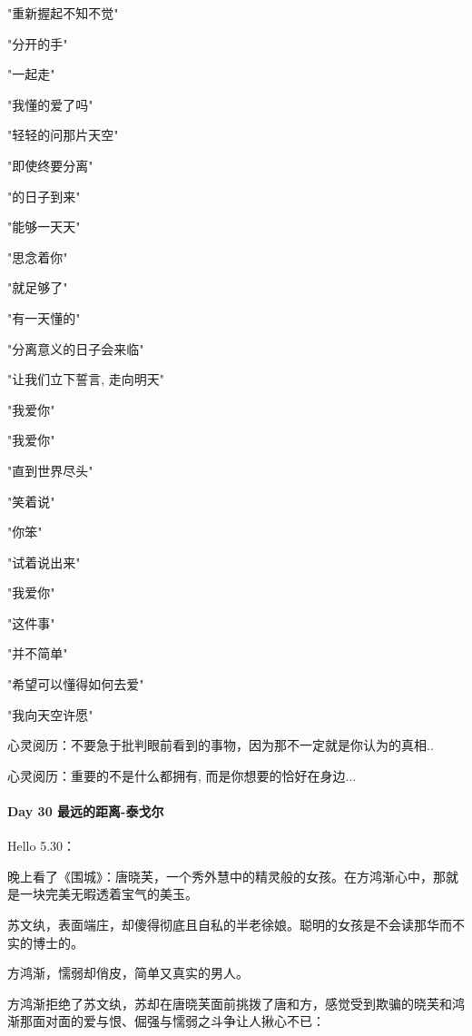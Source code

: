 \documentclass[UTF8,a4paper,8pt]{ctexbook}
\begin{document}
	 	 "重新握起不知不觉"
	 	 
	 	 "分开的手" 
	 	 
	 	 "一起走"
	 	 
	 	 "我懂的爱了吗"
	 	 
	 	 "轻轻的问那片天空"
	 	 
	 	 "即使终要分离"
	 	 
	 	 "的日子到来"
	 	 
	 	 "能够一天天"
	 	 
	 	 "思念着你"
	 	 
	 	 "就足够了" 
	 	 
	 	 "有一天懂的"
	 	 
	 	 "分离意义的日子会来临"
	 	 
	 	 "让我们立下誓言, 走向明天"
	 	 
	 		 	 "我爱你"
	 		 	 
	 		 	 "我爱你"
	 		 	 
	 		 	 "直到世界尽头"
	 		 	 
	 		 	 "笑着说"
	 		 	 
	 		 	 "你笨"
	 		 	 
	 		 	 "试着说出来"
	 		 	 
	 		 	 "我爱你" 
	 		 	 
	 		 	 "这件事"
	 		 	 
	 		 	 "并不简单"
	 		 	 
	 		 	 "希望可以懂得如何去爱"
	 		 	 
	 		 	 "我向天空许愿"	 	
	 		 	 
	 		 	 
	 	心灵阅历：不要急于批判眼前看到的事物，因为那不一定就是你认为的真相.. 	 	 	 	 	 	 	 
	 
	 	心灵阅历：重要的不是什么都拥有, 而是你想要的恰好在身边...	 
 	 \paragraph{Day 30   最远的距离-泰戈尔   \quad     }
	 	 Hello 5.30：
	 	 
	 	 晚上看了《围城》：唐晓芙，一个秀外慧中的精灵般的女孩。在方鸿渐心中，那就是一块完美无暇透着宝气的美玉。 
	 	 
	 	 苏文纨，表面端庄，却傻得彻底且自私的半老徐娘。聪明的女孩是不会读那华而不实的博士的。 
	 	 
	 	 方鸿渐，懦弱却俏皮，简单又真实的男人。 
	 	 
	 	 方鸿渐拒绝了苏文纨，苏却在唐晓芙面前挑拨了唐和方，感觉受到欺骗的晓芙和鸿渐那面对面的爱与恨、倔强与懦弱之斗争让人揪心不已： 
	 	 
\end{document}
